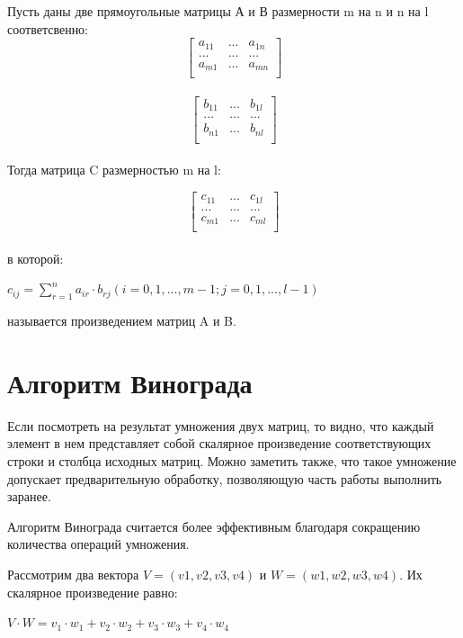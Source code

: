 \documentclass[a4paper,14pt]{report}
\begin{document}
Пусть даны две прямоугольные матрицы А и В размерности m на n и n на l соответсвенно:
\[ \begin{bmatrix}
a_{11} & ... & a_{1n} \\
... & ... & ... \\
a_{m1} & ... & a_{mn} \\
\end{bmatrix} \]\\

\[ \begin{bmatrix}
b_{11} & ... & b_{1l} \\
... & ... & ... \\
b_{n1} & ... & b_{nl} \\
\end{bmatrix} \]\\

Тогда матрица C размерностью m на l:

\[ \begin{bmatrix}
c_{11} & ... & c_{1l} \\
... & ... & ... \\
c_{m1} & ... & c_{ml} \\
\end{bmatrix} \]\\

в которой:

$c_{ij} = \sum\limits_{r=1}^n a_{ir}\cdot b_{rj}  (i = 0, 1, ..., m - 1; j = 0, 1, ..., l - 1)$

называется произведением матриц A и B.


\section*{Алгоритм Винограда}

Если посмотреть на результат умножения двух матриц, то видно, что каждый элемент в нем представляет собой скалярное произведение соответствующих строки и столбца исходных матриц. Можно заметить также, что такое умножение допускает предварительную обработку, позволяющую часть работы выполнить заранее.

Алгоритм Винограда считается более эффективным благодаря сокращению количества операций умножения.

Рассмотрим два вектора $V = (v1, v2, v3, v4)$ и $W = (w1, w2, w3, w4)$. Их скалярное произведение равно:

$ V \cdot W=v_1 \cdot w_1 + v_2 \cdot w_2 + v_3 \cdot w_3 + v_4 \cdot w_4$ \\
\end{document}
